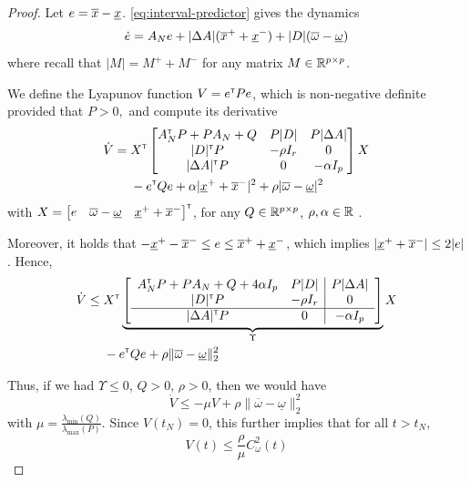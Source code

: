 \documentclass{article}
\begin{document}
\begin{proof}
	Let $e = \overline{x} - \underline{x}$. \eqref{eq:interval-predictor} gives the dynamics
	\begin{align*}
	\dot{e} = A_Ne + |\Delta A|(\overline{x}^+ + \underline{x}^-) + |D|(\overline{\omega} - \underline{\omega})
	\end{align*}
	where recall that $|M| = M^+ + M^-$ for any matrix $M\in\mathbb{R}^{p\times p}$.
	
	We define the Lyapunov function $V = e^{\mathsf{\scriptscriptstyle T}} P e$, which is non-negative definite provided that
	$
	P>0,
	$ and compute its derivative
	\begin{align*}
	\dot{V} ={}& X^{\mathsf{\scriptscriptstyle T}}
	\begin{bmatrix}
	A_N^{\mathsf{\scriptscriptstyle T}} P + P A_N + Q & P|D| & P|\Delta A| \\
	|D|^{\mathsf{\scriptscriptstyle T}} P & -\rho I_r & 0\\
	|\Delta A|^{\mathsf{\scriptscriptstyle T}} P & 0 & -\alpha I_p
	\end{bmatrix}
	X\\
	& - e^{\mathsf{\scriptscriptstyle T}} Q e + \alpha |\underline{x}^+ + \overline{x}^-|^2 + \rho |\overline{\omega} - \underline{\omega}|^2
	\end{align*}
	with $X=\begin{bmatrix}
	e & \overline{\omega} - \underline{\omega} &  \underline{x}^+ + \overline{x}^-
	\end{bmatrix}^{\mathsf{\scriptscriptstyle T}}$, for any $Q\in\mathbb{R}^{p\times p}$, $\rho,\alpha\in\mathbb{R}$ . 
	
	Moreover, it holds that $-\underline{x}^+ -\overline{x}^- \leq e \leq \overline{x}^+ + \underline{x}^-$, which implies $|\underline{x}^+ + \overline{x}^-| \leq 2 |e|$. Hence,
	\begin{align*}
	\dot{V} \leq {}& X^{\mathsf{\scriptscriptstyle T}}
	\underbrace{
		\left[
		\begin{array}{cc|c}
		A_N^{\mathsf{\scriptscriptstyle T}} P + P A_N + Q + 4\alpha I_p & P|D| & P|\Delta A| \\
		|D|^{\mathsf{\scriptscriptstyle T}} P & -\rho I_r & 0\\
		\hline
		|\Delta A|^{\mathsf{\scriptscriptstyle T}} P & 0 & -\alpha I_p
		\end{array}
		\right]}_{\Upsilon}
	X\\
	& - e^{\mathsf{\scriptscriptstyle T}} Q e + \rho \|\overline{\omega} - \underline{\omega}\|_2^2
	\end{align*}
	
	Thus, if we had $\Upsilon \leq 0$, $Q>0$, $\rho > 0$, then we would have
	\[
	\dot{V} \leq -\mu V + \rho \|\overline{\omega} - \underline{\omega}\|_2^2
	\]
	with $\mu = \frac{\lambda_{\min}(Q)}{\lambda_{\max}(P)}$. Since $V(t_N) = 0$, this further implies that for all $t>t_N$, 
	\begin{equation}
	\label{eq:lyap-bound}
	V(t) \leq \frac{\rho}{\mu} C_\omega^2(t)
	\end{equation}
	

\end{proof}
\end{document}
